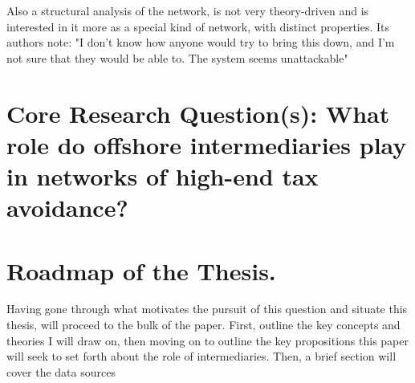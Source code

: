 Also a structural analysis of the network, is not very theory-driven and is interested in it more as a special kind of network, with distinct properties. Its authors note: "I don't know how anyone would try to bring this down, and I'm not sure that they would be able to. The system seems unattackable"

\section{Core Research Question(s): What role do offshore intermediaries play in networks of high-end tax avoidance?}
\label{sec:1_5}

\section{Roadmap of the Thesis.}
\label{sec:1_6}

Having gone through what motivates the pursuit of this question and situate this thesis, will proceed to the bulk of the paper. First, outline the key concepts and theories I will draw on, then moving on to outline the key propositions this paper will seek to set forth about the role of intermediaries. Then, a brief section will cover the data sources
